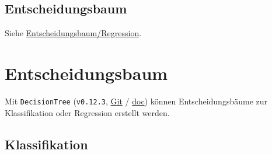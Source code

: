 \documentclass[10pt,twocolumn]{scrartcl}
\begin{document}
\subsection{Entscheidungsbaum}

Siehe \hyperref[ssec:EntscheidungsbaumRegression]{Entscheidungsbaum/Regression}.

\section{Entscheidungsbaum}

Mit \lstinline|DecisionTree| (\lstinline|v0.12.3|,
\href{https://github.com/JuliaAI/DecisionTree.jl}{Git} /
\href{https://docs.juliahub.com/DecisionTree/pEDeB/0.12.3/}{doc}) können
Entscheidungsbäume zur Klassifikation oder Regression erstellt werden.

\subsection{Klassifikation}
\label{ssec:EntscheidungsbaumKlassifikation}
\end{document}
